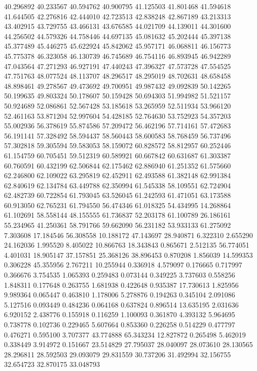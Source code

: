 40.296892
40.233567
40.594762
40.900795
41.125503
41.801468
41.594618
41.644505
42.276816
42.444010
42.723513
42.838248
42.867189
43.213313
43.402915
43.729755
43.466131
43.676585
44.021709
44.139011
44.301600
44.256502
44.579326
44.758446
44.697135
45.081632
45.202444
45.397138
45.377489
45.446275
45.622924
45.842062
45.957171
46.068811
46.156773
45.775378
46.323058
46.130739
46.745689
46.754116
46.893945
46.942289
47.043564
47.271293
46.927191
47.440243
47.396327
47.573728
47.554525
47.751763
48.077524
48.113707
48.296517
48.295019
48.702631
48.658458
48.898461
49.278567
49.473692
49.700951
49.987432
49.092839
50.142265
50.199635
49.803324
50.178607
50.159428
50.694303
51.994982
51.521157
50.924689
52.086861
52.567428
53.185618
53.265959
52.511934
53.966120
52.461163
53.871204
52.997604
54.428185
52.764630
53.752923
54.357203
55.002936
56.378619
55.874586
57.209472
56.462196
57.714161
57.472683
56.191141
57.328492
58.594437
58.560443
58.600583
58.768459
56.737496
57.302818
59.305594
59.583053
58.159072
60.828572
58.812957
60.252446
61.154759
60.705451
59.512319
60.589921
60.667842
60.631687
61.303387
60.760591
60.432199
62.506844
62.175462
62.886940
61.251352
61.575660
62.246800
62.109022
63.295819
62.452911
62.493588
61.382148
62.991384
62.840619
62.134784
63.449788
62.350994
61.545338
58.109551
62.724904
62.482739
60.722854
61.793045
63.526045
61.242593
61.471051
63.173588
60.913050
62.765231
61.794550
56.474346
61.018325
54.434995
14.268864
61.102691
58.558144
48.155555
61.736837
52.203178
61.100789
26.186161
55.234965
41.250361
58.791766
59.662090
56.231182
53.933133
61.275092
7.303608
17.184546
56.308558
10.188172
47.143697
28.940871
6.322310
2.655290
24.162036
1.995520
8.405022
10.866763
18.343843
0.865671
2.512135
56.774051
4.401031
18.905147
37.157851
25.368126
38.896453
0.870208
1.856039
14.599353
0.306228
45.355956
2.767211
10.255944
0.336918
4.579097
0.176665
0.717997
0.366676
3.754535
1.065393
0.259483
0.073144
0.349225
3.737603
0.558256
1.848311
0.177648
0.263755
1.681938
0.422648
0.935387
17.730613
1.825956
9.989364
0.065447
0.463810
1.178006
5.278876
0.194263
0.345104
2.091086
5.127516
0.093449
0.484236
0.064168
0.637824
0.896514
13.635195
2.031636
6.920152
2.438776
0.155918
0.116259
1.100093
0.361870
4.393132
5.964695
0.738778
0.102736
0.229465
5.607664
0.853360
0.226258
0.514229
0.477797
0.476271
0.595100
3.707377
43.774888
65.343234
12.827872
0.265498
5.462019
0.338449
3.914972
0.151667
23.514829
27.795037
28.040097
28.073610
28.130565
28.296811
28.592503
29.093079
29.831559
30.737206
31.492994
32.156755
32.654723
32.870175
33.048793

